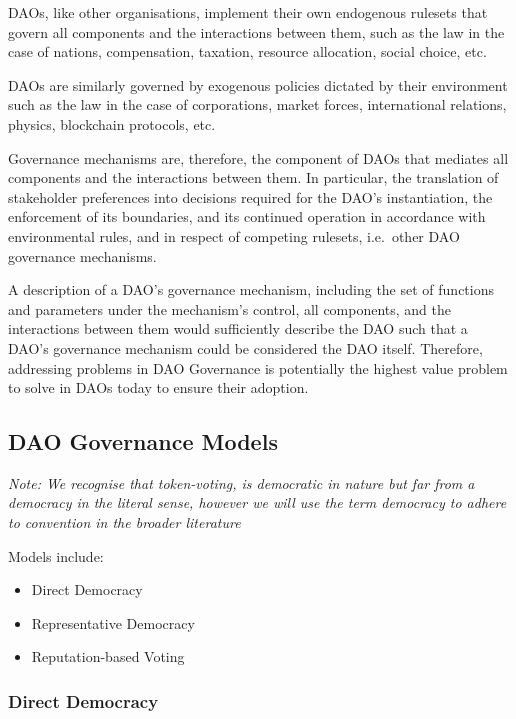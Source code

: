 \documentclass[
]{article}
\providecommand{\tightlist}{%
  \setlength{\itemsep}{0pt}\setlength{\parskip}{0pt}}
\begin{document}
DAOs, like other organisations, implement their own endogenous rulesets
that govern all components and the interactions between them, such as
the law in the case of nations, compensation, taxation, resource
allocation, social choice, etc.

DAOs are similarly governed by exogenous policies dictated by their
environment such as the law in the case of corporations, market forces,
international relations, physics, blockchain protocols, etc.

Governance mechanisms are, therefore, the component of DAOs that
mediates all components and the interactions between them. In
particular, the translation of stakeholder preferences into decisions
required for the DAO's instantiation, the enforcement of its boundaries,
and its continued operation in accordance with environmental rules, and
in respect of competing rulesets, i.e.~other DAO governance mechanisms.

A description of a DAO's governance mechanism, including the set of
functions and parameters under the mechanism's control, all components,
and the interactions between them would sufficiently describe the DAO
such that a DAO's governance mechanism could be considered the DAO
itself. Therefore, addressing problems in DAO Governance is potentially
the highest value problem to solve in DAOs today to ensure their
adoption.

\hypertarget{dao-governance-models}{%
\subsection{DAO Governance Models}\label{dao-governance-models}}

\emph{Note: We recognise that token-voting, is democratic in nature but
far from a democracy in the literal sense, however we will use the term
democracy to adhere to convention in the broader literature}

Models include:

\begin{itemize}
\tightlist
\item
  Direct Democracy
\item
  Representative Democracy
\item
  Reputation-based Voting
\end{itemize}

\hypertarget{direct-democracy}{%
\subsubsection{\texorpdfstring{\textbf{Direct
Democracy}}{Direct Democracy}}\label{direct-democracy}}
\end{document}
